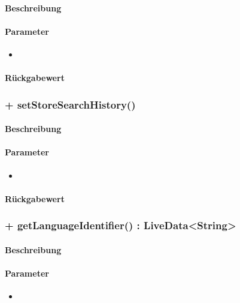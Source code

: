 \paragraph*{Beschreibung}

\paragraph*{Parameter}
\begin{itemize}
    \item 
\end{itemize}
\paragraph*{Rückgabewert}


\subsubsection{+ setStoreSearchHistory()}%
\paragraph*{Beschreibung}

\paragraph*{Parameter}
\begin{itemize}
    \item 
\end{itemize}
\paragraph*{Rückgabewert}


\subsubsection{+ getLanguageIdentifier() : LiveData<String>}%
\paragraph*{Beschreibung}

\paragraph*{Parameter}
\begin{itemize}
    \item 
\end{itemize}
